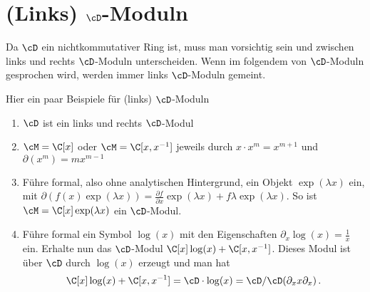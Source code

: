 \section{(Links) $\cD$-Moduln}
Da $\cD$ ein nichtkommutativer Ring ist, muss man vorsichtig sein und zwischen
links und rechts $\cD$-Moduln unterscheiden.
Wenn im folgendem von $\cD$-Moduln gesprochen wird, werden immer
links $\cD$-Moduln gemeint.

\begin{exmp}
Hier ein paar Beispiele für (links) $\cD$-Moduln
\begin{comment}
\cite[Exmp 2.2]{ArkhipovDmod}
\end{comment}
\begin{enumerate}
%
\item $\cD$ ist ein links und rechts $\cD$-Modul
%
\item $\cM=\C[x]$ oder $\cM=\C[x,x^{-1}]$ jeweils durch $x\cdot x^{m}=x^{m+1}$
und $\partial(x^m)=mx^{m-1}$
%
\item
Führe formal, also ohne analytischen Hintergrund, ein Objekt
$\exp(\lambda x)$ ein, mit $\partial(f(x)\exp(\lambda x))=\frac{\partial
f}{\partial x}\exp(\lambda x)+f\lambda\exp(\lambda x)$.  So ist
$\cM=\C[x]\exp(\lambda x)$ ein $\cD$-Modul.
%
\begin{comment}
\cite[Exmp 2.2]{ArkhipovDmod}
\end{comment}
\item 
Führe formal ein Symbol $\log(x)$ mit den Eigenschaften
$\partial_x\log(x)=\frac{1}{x}$ ein. Erhalte nun das $\cD$-Modul
$\C[x]\log(x)+\C[x,x^{-1}]$. Dieses Modul ist über $\cD$ durch $\log(x)$
erzeugt und man hat
\[
\C[x]\log(x)+\C[x,x^{-1}]=\cD\cdot\log(x)=\cD\slash\cD(\partial_x x\partial_x) \,.
\]
%
\begin{comment}
\cite[Exmp 3.1.4]{ginzburg}
\end{comment}
\end{enumerate}
\end{exmp}

\begin{comment}
\begin{lem}\cite[Lem 2.3.3.]{sabbah_cimpa90}
Sei $\cM$ ein links $\cD$-Modul von endlichem Typ, welches auch von endlichem
Typ über $\Ckx$ ist. Dann ist $\cM$ bereits ein freies $\C\{x\}$-Modul.
\end{lem}
\begin{proof}
Siehe \cite[Lem 2.3.3.]{sabbah_cimpa90}.
\end{proof}
\begin{cor} \cite[Cor 2.3.4.]{sabbah_cimpa90}
Falls $\cM$ ein links $\cD$-Modul von endlichem Typ, welches außerdem ein
endlich dimensionaler Vektorraum ist, so ist schon $\cM=\{0\}$.
\end{cor}
\end{comment}

